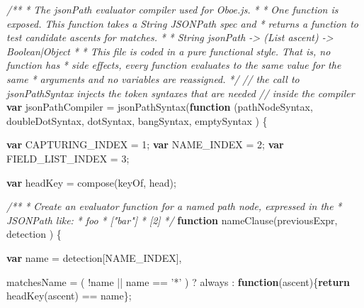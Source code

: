 \documentclass[12pt, ]{article}
\newenvironment{Shaded}{}{}
\newcommand{\KeywordTok}[1]{\textcolor[rgb]{0.00,0.44,0.13}{\textbf{{#1}}}}
\newcommand{\DecValTok}[1]{\textcolor[rgb]{0.25,0.63,0.44}{{#1}}}
\newcommand{\StringTok}[1]{\textcolor[rgb]{0.25,0.44,0.63}{{#1}}}
\newcommand{\CommentTok}[1]{\textcolor[rgb]{0.38,0.63,0.69}{\textit{{#1}}}}
\newcommand{\FunctionTok}[1]{\textcolor[rgb]{0.02,0.16,0.49}{{#1}}}
\newcommand{\NormalTok}[1]{{#1}}
\begin{document}
\begin{Shaded}
\begin{Highlighting}[]
\CommentTok{/**}
\CommentTok{ * The jsonPath evaluator compiler used for Oboe.js. }
\CommentTok{ * }
\CommentTok{ * One function is exposed. This function takes a String JSONPath spec and }
\CommentTok{ * returns a function to test candidate ascents for matches.}
\CommentTok{ * }
\CommentTok{ *  String jsonPath -> (List ascent) -> Boolean|Object}
\CommentTok{ *}
\CommentTok{ * This file is coded in a pure functional style. That is, no function has }
\CommentTok{ * side effects, every function evaluates to the same value for the same }
\CommentTok{ * arguments and no variables are reassigned.}
\CommentTok{ */}  
\CommentTok{// the call to jsonPathSyntax injects the token syntaxes that are needed }
\CommentTok{// inside the compiler}
\KeywordTok{var} \NormalTok{jsonPathCompiler = }\FunctionTok{jsonPathSyntax}\NormalTok{(}\KeywordTok{function} \NormalTok{(pathNodeSyntax, }
                                                \NormalTok{doubleDotSyntax, }
                                                \NormalTok{dotSyntax,}
                                                \NormalTok{bangSyntax,}
                                                \NormalTok{emptySyntax ) \{}

   \KeywordTok{var} \NormalTok{CAPTURING_INDEX = }\DecValTok{1}\NormalTok{;}
   \KeywordTok{var} \NormalTok{NAME_INDEX = }\DecValTok{2}\NormalTok{;}
   \KeywordTok{var} \NormalTok{FIELD_LIST_INDEX = }\DecValTok{3}\NormalTok{;}

   \KeywordTok{var} \NormalTok{headKey = }\FunctionTok{compose}\NormalTok{(keyOf, head);}
                   
   \CommentTok{/**}
\CommentTok{    * Create an evaluator function for a named path node, expressed in the}
\CommentTok{    * JSONPath like:}
\CommentTok{    *    foo}
\CommentTok{    *    ["bar"]}
\CommentTok{    *    [2]   }
\CommentTok{    */}
   \KeywordTok{function} \FunctionTok{nameClause}\NormalTok{(previousExpr, detection ) \{}
     
      \KeywordTok{var} \NormalTok{name = detection[NAME_INDEX],}
            
          \NormalTok{matchesName = ( !name || name == }\StringTok{'*'} \NormalTok{) }
                           \NormalTok{?  always}
                           \NormalTok{:  }\KeywordTok{function}\NormalTok{(ascent)\{}\KeywordTok{return} \FunctionTok{headKey}\NormalTok{(ascent) == name\};}
     


\end{Highlighting}
\end{Shaded}
\end{document}
